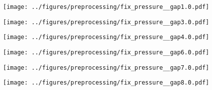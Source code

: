\begin{figure}[p] %
    \centering

    \begin{minipage}[t]{0.31\textwidth}
        \centering
        \texttt{[image: ../figures/preprocessing/fix\_pressure\_\_gap1.0.pdf]}
        \label{fig:fix_pressure_g1}
    \end{minipage}\hfill
    \begin{minipage}[t]{0.31\textwidth}
        \centering
        \texttt{[image: ../figures/preprocessing/fix\_pressure\_\_gap3.0.pdf]}
        \label{fig:fix_pressure_g3}
    \end{minipage}\hfill
    \begin{minipage}[t]{0.31\textwidth}
        \centering
        \texttt{[image: ../figures/preprocessing/fix\_pressure\_\_gap4.0.pdf]}
        \label{fig:fix_pressure_g4}
    \end{minipage}

    \vspace{0.5em}

    \begin{minipage}[t]{0.31\textwidth}
        \centering
        \texttt{[image: ../figures/preprocessing/fix\_pressure\_\_gap6.0.pdf]}
        \label{fig:fix_pressure_g6}
    \end{minipage}\hfill
    \begin{minipage}[t]{0.31\textwidth}
        \centering
        \texttt{[image: ../figures/preprocessing/fix\_pressure\_\_gap7.0.pdf]}
        \label{fig:fix_pressure_g7}
    \end{minipage}\hfill
    \begin{minipage}[t]{0.31\textwidth}
        \centering
        \texttt{[image: ../figures/preprocessing/fix\_pressure\_\_gap8.0.pdf]}
        \label{fig:fix_pressure_g8}
    \end{minipage}

    \vspace{0.5em}


\end{figure}
